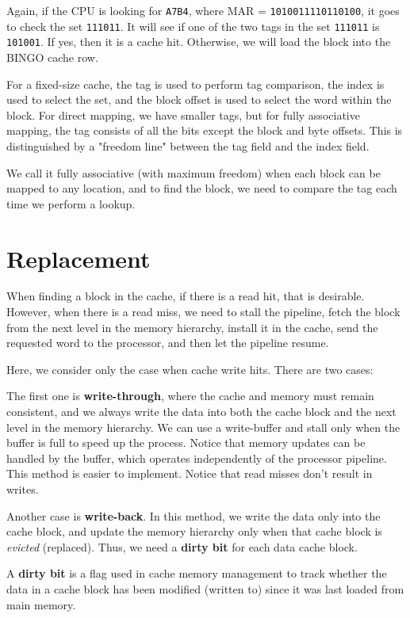 Again, if the CPU is looking for \verb|A7B4|, where MAR = \verb|1010011110110100|, it goes to check the set \verb|111011|. It will see if one of the two tags in the set \verb|111011| is \verb|101001|. If yes, then it is a cache hit. Otherwise, we will load the block into the BINGO cache row.

For a fixed-size cache, the tag is used to perform tag comparison, the index is used to select the set, and the block offset is used to select the word within the block. For direct mapping, we have smaller tags, but for fully associative mapping, the tag consists of all the bits except the block and byte offsets. This is distinguished by a "freedom line" between the tag field and the index field.

We call it fully associative (with maximum freedom) when each block can be mapped to any location, and to find the block, we need to compare the tag each time we perform a lookup.

\section{Replacement}
When finding a block in the cache, if there is a read hit, that is desirable. However, when there is a read miss, we need to stall the pipeline, fetch the block from the next level in the memory hierarchy, install it in the cache, send the requested word to the processor, and then let the pipeline resume.

Here, we consider only the case when cache write hits. There are two cases:

The first one is \textbf{write-through}, where the cache and memory must remain consistent, and we always write the data into both the cache block and the next level in the memory hierarchy. We can use a write-buffer and stall only when the buffer is full to speed up the process. Notice that memory updates can be handled by the buffer, which operates independently of the processor pipeline. This method is easier to implement. Notice that read misses don't result in writes. 

Another case is \textbf{write-back}. In this method, we write the data only into the cache block, and update the memory hierarchy only when that cache block is \textit{evicted} (replaced). Thus, we need a \textbf{dirty bit} for each data cache block.

\begin{remark}
  A \textbf{dirty bit} is a flag used in cache memory management to track whether the data in a cache block has been modified (written to) since it was last loaded from main memory.
\end{remark}

